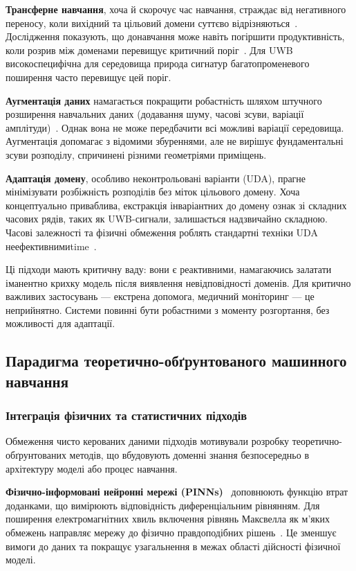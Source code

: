 \documentclass[12pt,a4paper]{article}
\begin{document}
\textbf{Трансферне навчання}, хоча й скорочує час навчання, страждає від негативного переносу, коли вихідний та цільовий домени суттєво відрізняються~\cite{weiss2016survey}. Дослідження показують, що донавчання може навіть погіршити продуктивність, коли розрив між доменами перевищує критичний поріг~\cite{wang2019characterizing}. Для UWB високоспецифічна для середовища природа сигнатур багатопроменевого поширення часто перевищує цей поріг.

\textbf{Аугментація даних} намагається покращити робастність шляхом штучного розширення навчальних даних (додавання шуму, часові зсуви, варіації амплітуди)~\cite{shorten2019survey}. Однак вона не може передбачити всі можливі варіації середовища. Аугментація допомагає з відомими збуреннями, але не вирішує фундаментальні зсуви розподілу, спричинені різними геометріями приміщень.

\textbf{Адаптація домену}, особливо неконтрольовані варіанти (UDA), прагне мінімізувати розбіжність розподілів без міток цільового домену. Хоча концептуально приваблива, екстракція інваріантних до домену ознак зі складних часових рядів, таких як UWB-сигнали, залишається надзвичайно складною. Часові залежності та фізичні обмеження роблять стандартні техніки UDA неефективнимиtime~\cite{time_series_uda_2021}.

Ці підходи мають критичну ваду: вони є реактивними, намагаючись залатати іманентно крихку модель після виявлення невідповідності доменів. Для критично важливих застосувань --- екстрена допомога, медичний моніторинг --- це неприйнятно. Системи повинні бути робастними з моменту розгортання, без можливості для адаптації.

\subsection{Парадигма теоретично-обґрунтованого машинного навчання}

\subsubsection{Інтеграція фізичних та статистичних підходів}

Обмеження чисто керованих даними підходів мотивували розробку теоретично-обґрунтованих методів, що вбудовують доменні знання безпосередньо в архітектуру моделі або процес навчання.

\textbf{Фізично-інформовані нейронні мережі (PINNs)}~\cite{raissi2019physics} доповнюють функцію втрат доданками, що вимірюють відповідність диференціальним рівнянням. Для поширення електромагнітних хвиль включення рівнянь Максвелла як м'яких обмежень направляє мережу до фізично правдоподібних рішень~\cite{karniadakis2021physics}. Це зменшує вимоги до даних та покращує узагальнення в межах області дійсності фізичної моделі.
\end{document}
